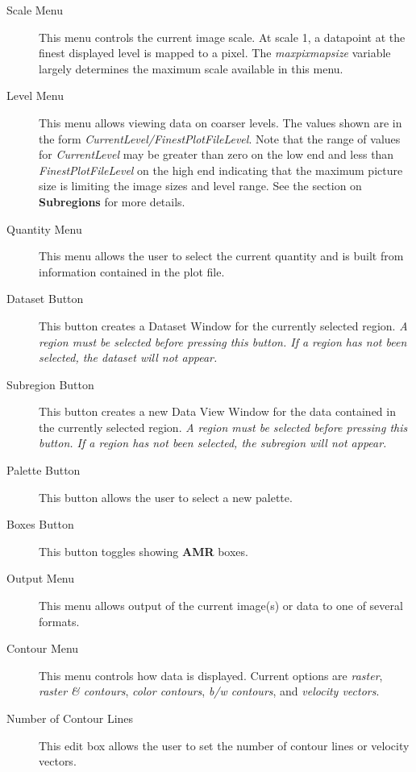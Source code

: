 \begin{description}
\item[Scale Menu]  This menu controls the current image scale.  At
scale 1, a datapoint at the finest displayed level is mapped to a pixel.
The {\em maxpixmapsize} variable largely determines the maximum scale available
in this menu.

\item[Level Menu] This menu allows viewing data on coarser levels.
The values shown are in the form {\em CurrentLevel/FinestPlotFileLevel}.
Note that the range of values for {\em CurrentLevel} may be greater than
zero on the low end and less than {\em FinestPlotFileLevel} on the high
end indicating that the maximum picture size is limiting the image sizes
and level range.  See the section on {\bf Subregions} for more details.

\item[Quantity Menu]  This menu allows the user to select the current
quantity and is built from information contained in the plot file.

\item[Dataset Button]  This button creates a Dataset Window for the
currently selected region.  {\em A region must be selected before
pressing this button.  If a region has not been selected, the dataset
will not appear.}

\item[Subregion Button]  This button creates a new Data View Window for the
data contained in the currently selected region.  {\em A region must be
selected before pressing this button.  If a region has not been selected,
the subregion will not appear.}

\item[Palette Button]  This button allows the user to select a new palette.

\item[Boxes Button]  This button toggles showing {\bf AMR} boxes.

\item[Output Menu]  This menu allows output of the current image(s) or
data to one of several formats.

\item[Contour Menu]  This menu controls how data is displayed.  Current
options are {\em raster}, {\em raster \& contours}, {\em color contours},
{\em b/w contours}, and {\em velocity vectors}.

\item[Number of Contour Lines]  This edit box allows the user to set
the number of contour lines or velocity vectors.


\end{description}
